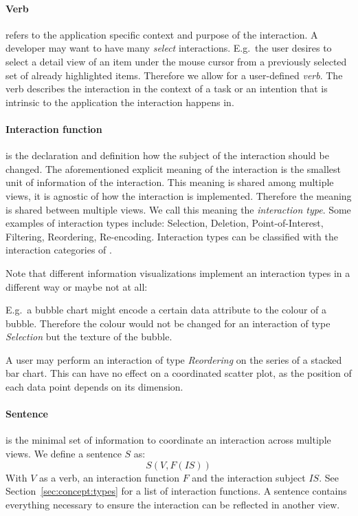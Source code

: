 \documentclass{article}
\begin{document}
\paragraph{Verb} refers to the application specific context and purpose of the interaction.
A developer may want to have many \emph{select} interactions.
E.g.\ the user desires to select a detail view of an item under the mouse cursor from a previously selected set of already highlighted items.
Therefore we allow for a user-defined \emph{verb}.
The verb describes the interaction in the context of a task or an intention that is intrinsic to the application the interaction happens in.

\paragraph{Interaction function} is the declaration and definition how the subject of the interaction should be changed.
The aforementioned explicit meaning of the interaction is the smallest unit of information of the interaction.
This meaning is shared among multiple views, it is agnostic of how the interaction is implemented.
Therefore the meaning is shared between multiple views.
We call this meaning the \emph{interaction type}.
Some examples of interaction types include: Selection, Deletion, Point-of-Interest, Filtering, Reordering, Re-encoding.
Interaction types can be classified with the interaction categories of \textcite{Yi2007}.

Note that different information visualizations implement an interaction types in a different way or maybe not at all:

E.g.\ a bubble chart might encode a certain data attribute to the colour of a bubble.
Therefore the colour would not be changed for an interaction of type \emph{Selection} but the texture of the bubble.

A user may perform an interaction of type \emph{Reordering} on the series of a stacked bar chart.
This can have no effect on a coordinated scatter plot, as the position of each data point depends on its dimension.

\paragraph{Sentence} is the minimal set of information to coordinate an interaction across multiple views.
We define a sentence $S$ as:
\begin{equation}
    S(V, F(IS))
\end{equation}
With $V$ as a verb, an interaction function $F$ and the interaction subject $IS$.
See Section~\ref{sec:concept:types} for a list of interaction functions.
A sentence contains everything necessary to ensure the interaction can be reflected in another view.
\end{document}
